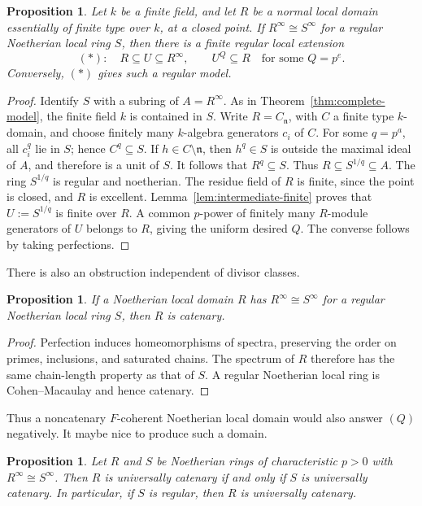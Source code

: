 \documentclass[11pt,a4paper]{amsart}
\numberwithin{equation}{section}
\newtheorem{proposition}[theorem]{Proposition}
\begin{document}
 \begin{proposition}\label{thm:finite-type-model}	Let $k$ be a finite field, and let $R$ be a normal local domain 	essentially of finite type over $k$, at a closed point. 	If $R^\infty\cong S^\infty$ for a regular Noetherian local ring $S$,	then there is a finite regular local extension 	$$
(\ast):\quad 	R\subseteq U\subseteq R^\infty,\qquad U^Q\subseteq R
 	\quad\text{for some }Q=p^e.	$$	Conversely, $(\ast)$ gives such a regular model.
 \end{proposition}
 
 \begin{proof}
Identify $S$ with a subring of $A=R^\infty$.	As in Theorem~\ref{thm:complete-model}, the finite field $k$	is contained in $S$. 	Write $R=C_{\mathfrak n}$, with $C$ a finite type $k$-domain, 	and choose finitely many $k$-algebra generators $c_i$ of $C$. 	For some $q=p^a$, all $c_i^q$ lie in $S$; hence $C^q\subseteq S$. 	If $h\in C\setminus\mathfrak n$, then $h^q\in S$ is outside	the maximal ideal of $A$, and therefore is a unit of $S$. 	It follows that $R^q\subseteq S$.	Thus
$	R\subseteq S^{1/q}\subseteq A.$	The ring $S^{1/q}$ is regular and noetherian.	The residue field of $R$ is finite, since the point is closed,	and $R$ is excellent.	Lemma~\ref{lem:intermediate-finite} proves that 	$U:=S^{1/q}$ is finite over $R$. 	A common $p$-power of finitely many $R$-module generators 	of $U$ belongs to $R$, giving the uniform desired $Q$. 	The converse follows by taking perfections.
 \end{proof}
 
  There is also an obstruction independent of divisor classes.
 
 \begin{proposition}\label{prop:catenary}	If a Noetherian local domain $R$ has	$R^\infty\cong S^\infty$ for a regular Noetherian local ring $S$,	then $R$ is catenary.
 \end{proposition}
 \begin{proof}	Perfection induces homeomorphisms of spectra, preserving the	order on primes, inclusions, and saturated chains.	The spectrum of $R$ therefore has the same chain-length	property as that of $S$.	A regular Noetherian local ring is Cohen--Macaulay and hence	catenary.
 \end{proof}
 
 Thus a noncatenary $F$-coherent Noetherian local domain would
 also answer $(Q)$ negatively. It maybe nice to produce  such a domain.
 
 
 \begin{proposition}\label{prop:catenary} 	Let $R$ and $S$ be Noetherian rings of characteristic $p>0$ with 	$R^\infty\cong S^\infty$. Then $R$ is universally catenary if and only if	$S$ is universally catenary. In particular, if $S$ is regular, then	$R$ is universally catenary.
 \end{proposition}
 
\end{document}
